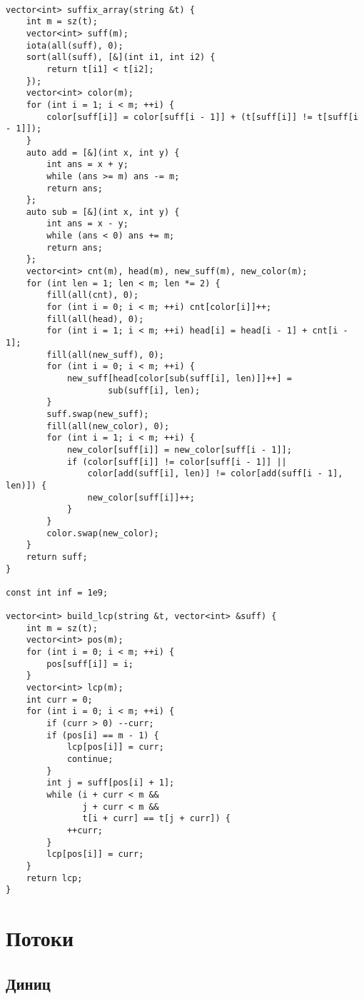 \documentclass{article}
\begin{document}
    \begin{verbatim}

vector<int> suffix_array(string &t) {
    int m = sz(t);
    vector<int> suff(m);
    iota(all(suff), 0);
    sort(all(suff), [&](int i1, int i2) {
        return t[i1] < t[i2];
    });
    vector<int> color(m);
    for (int i = 1; i < m; ++i) {
        color[suff[i]] = color[suff[i - 1]] + (t[suff[i]] != t[suff[i - 1]]);
    }
    auto add = [&](int x, int y) {
        int ans = x + y;
        while (ans >= m) ans -= m;
        return ans;
    };
    auto sub = [&](int x, int y) {
        int ans = x - y;
        while (ans < 0) ans += m;
        return ans;
    };
    vector<int> cnt(m), head(m), new_suff(m), new_color(m);
    for (int len = 1; len < m; len *= 2) {
        fill(all(cnt), 0);
        for (int i = 0; i < m; ++i) cnt[color[i]]++;
        fill(all(head), 0);
        for (int i = 1; i < m; ++i) head[i] = head[i - 1] + cnt[i - 1];
        fill(all(new_suff), 0);
        for (int i = 0; i < m; ++i) {
            new_suff[head[color[sub(suff[i], len)]]++] =
                    sub(suff[i], len);
        }
        suff.swap(new_suff);
        fill(all(new_color), 0);
        for (int i = 1; i < m; ++i) {
            new_color[suff[i]] = new_color[suff[i - 1]];
            if (color[suff[i]] != color[suff[i - 1]] ||
                color[add(suff[i], len)] != color[add(suff[i - 1], len)]) {
                new_color[suff[i]]++;
            }
        }
        color.swap(new_color);
    }
    return suff;
}

const int inf = 1e9;

vector<int> build_lcp(string &t, vector<int> &suff) {
    int m = sz(t);
    vector<int> pos(m);
    for (int i = 0; i < m; ++i) {
        pos[suff[i]] = i;
    }
    vector<int> lcp(m);
    int curr = 0;
    for (int i = 0; i < m; ++i) {
        if (curr > 0) --curr;
        if (pos[i] == m - 1) {
            lcp[pos[i]] = curr;
            continue;
        }
        int j = suff[pos[i] + 1];
        while (i + curr < m &&
               j + curr < m &&
               t[i + curr] == t[j + curr]) {
            ++curr;
        }
        lcp[pos[i]] = curr;
    }
    return lcp;
}
    \end{verbatim}

    \section*{Потоки}

    \subsection{Диниц}
\end{document}
